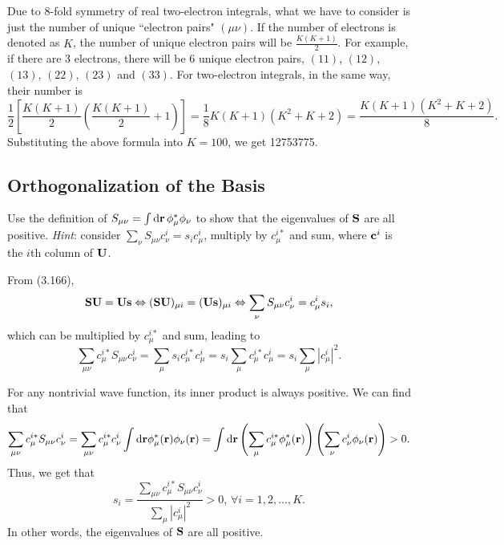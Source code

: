 \documentclass[a4paper]{book}
\newcounter{exercise}[chapter]
\newcounter{solution}[chapter]
\newcommand*{\dif}{\mathop{}\!\mathrm{d}}
\newcommand{\SSS}{{\bf S}}
\newcommand{\U}{{\bf U}}
\newcommand{\bfr}{{\bf r}}
\begin{document}
	\begin{solution}
	
	Due to 8-fold symmetry of real two-electron integrals, what we have to consider is just the number of unique ``electron pairs" $(\mu\nu)$. If the number of electrons is denoted as $K$, the number of unique electron pairs will be $\frac{ K(K+1) }{2}$. For example, if there are 3 electrons, there will be 6 unique electron pairs, $(11)$, $(12)$, $(13)$, $(22)$, $(23)$ and $(33)$. For two-electron integrals, in the same way, their number is
	\[
		\frac{1}{2} \left[ \frac{ K(K+1) }{2} \left( \frac{ K(K+1) }{2} + 1 \right) \right] = \frac{1}{8} K (K+1) (K^2 + K + 2) = \frac{ K ( K + 1 )( K^2 + K + 2 ) }{8} .
	\]
	Substituting the above formula into $K = 100$, we get 12753775.
	\end{solution}
	
	\subsection{Orthogonalization of the Basis}
	
	\begin{exercise}
	Use the definition of $S_{\mu\nu} = \int \dif \bfr \, \phi^*_\mu \phi_\nu$ to show that the eigenvalues of $\SSS$ are all positive. {\it Hint}: consider $\sum_\nu S_{\mu\nu} c^i_\nu = s_i c^i_\mu$, multiply by $c^{i*}_\mu$ and sum, where ${\bf c}^i$ is the $i$th column of $\U$.
	\end{exercise}
	
	\begin{solution}
	
	From (3.166), 
	\[
		\SSS \U = \U {\bf s} \Leftrightarrow (\SSS \U)_{\mu i} = ( \U {\bf s} )_{\mu i} \Leftrightarrow \sum_\nu S_{\mu \nu} c^i_\nu = c^i_\mu s_i,
	\]
	which can be multiplied by $c^{i*}_\mu$ and sum, leading to
	\[
		\sum_{\mu \nu} c^{i*}_\mu S_{\mu \nu} c^i_\nu = \sum_\mu s_i c^{i*}_\mu c^i_\mu = s_i \sum_\mu c^{i*}_\mu c^i_\mu = s_i \sum_\mu | c^i_\mu |^2 .
	\]
	
	For any nontrivial wave function, its inner product is always positive. We can find that
	\[
		\sum_{\mu \nu} c^{i*}_\mu S_{\mu \nu} c^i_\nu = \sum_{\mu \nu} c^{i*}_\mu c^i_\nu \int \dif \bfr \phi^*_\mu( \bfr ) \phi_\nu( \bfr ) = \int \dif \bfr \left( \sum_\mu c^{i*}_\mu \phi^*_\mu( \bfr ) \right) \left( \sum_\nu c^i_\nu \phi_\nu( \bfr ) \right) > 0 .
	\]
	Thus, we get that
	\begin{equation}
		s_i = \frac{ \sum_{\mu \nu} c^{i*}_\mu S_{\mu \nu} c^i_\nu }{ \sum_\mu | c^i_\mu |^2 } > 0 , \, \forall i = 1, 2, \ldots, K.
	\end{equation}
	In other words, the eigenvalues of $\SSS$ are all positive.
	
	\end{solution}
	
\end{document}
